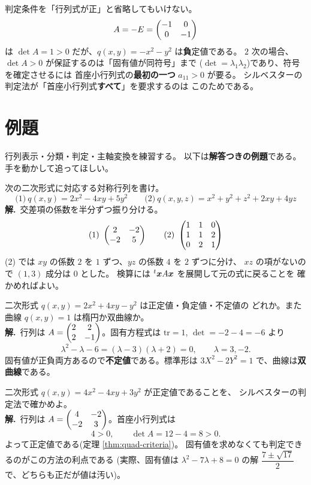 \begin{hanrei}\label{hanrei:quad-det}
判定条件を「行列式が正」と省略してもいけない。
\[
A = -E = \begin{pmatrix}-1 & 0 \\ 0 & -1\end{pmatrix}
\]
は $\det A = 1 > 0$ だが、$q(x, y) = -x^2 - y^2$ は\textbf{負}定値である。
$2$ 次の場合、$\det A > 0$ が保証するのは「固有値が同符号」まで
($\det = \lambda_1\lambda_2$)であり、符号を確定させるには
首座小行列式の\textbf{最初の一つ} $a_{11} > 0$ が要る。
シルベスターの判定法が「首座小行列式\textbf{すべて}」を要求するのは
このためである。
\end{hanrei}

\section{例題}

行列表示・分類・判定・主軸変換を練習する。
以下は\textbf{解答つきの例題}である。手を動かして追ってほしい。

\begin{rei}[例題・基本(行列表示)]\label{rei:quad-matrix}
次の二次形式に対応する対称行列を書け。
\[
\text{(1)}\ q(x, y) = 2x^2 - 4xy + 5y^2 \qquad
\text{(2)}\ q(x, y, z) = x^2 + y^2 + z^2 + 2xy + 4yz
\]
\textbf{解.}\ 交差項の係数を半分ずつ振り分ける。
\[
\text{(1)}\ \begin{pmatrix}2 & -2 \\ -2 & 5\end{pmatrix} \qquad
\text{(2)}\ \begin{pmatrix}1 & 1 & 0 \\ 1 & 1 & 2 \\ 0 & 2 & 1\end{pmatrix}
\]
(2) では $xy$ の係数 $2$ を $1$ ずつ、$yz$ の係数 $4$ を $2$ ずつに分け、
$xz$ の項がないので $(1, 3)$ 成分は $0$ とした。
検算には ${}^t\bm{x}A\bm{x}$ を展開して元の式に戻ることを
確かめればよい。
\end{rei}

\begin{rei}[例題・基本(固有値による分類)]\label{rei:quad-classify}
二次形式 $q(x, y) = 2x^2 + 4xy - y^2$ は正定値・負定値・不定値の
どれか。また曲線 $q(x, y) = 1$ は楕円か双曲線か。\\
\textbf{解.}\ 行列は $A = \begin{pmatrix}2 & 2 \\ 2 & -1\end{pmatrix}$。固有方程式は
$\mathrm{tr} = 1$, $\det = -2 - 4 = -6$ より
\[
\lambda^2 - \lambda - 6 = (\lambda - 3)(\lambda + 2) = 0, \qquad
\lambda = 3, -2.
\]
固有値が正負両方あるので\textbf{不定値}である。標準形は
$3X^2 - 2Y^2 = 1$ で、曲線は\textbf{双曲線}である。
\end{rei}

\begin{rei}[例題・基本(シルベスターの判定法)]\label{rei:quad-sylv}
二次形式 $q(x, y) = 4x^2 - 4xy + 3y^2$ が正定値であることを、
シルベスターの判定法で確かめよ。\\
\textbf{解.}\ 行列は $A = \begin{pmatrix}4 & -2 \\ -2 & 3\end{pmatrix}$。首座小行列式は
\[
4 > 0, \qquad \det A = 12 - 4 = 8 > 0.
\]
よって正定値である(定理 \ref{thm:quad-criteria})。
固有値を求めなくても判定できるのがこの方法の利点である
(実際、固有値は $\lambda^2 - 7\lambda + 8 = 0$ の解
$\dfrac{7 \pm \sqrt{17}}{2}$ で、どちらも正だが値は汚い)。
\end{rei}

